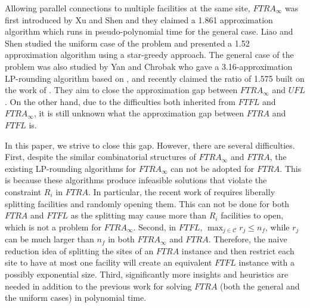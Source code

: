 \documentclass[10pt]{llncs}
\begin{document}
Allowing parallel connections to multiple facilities at the same site,
$FTRA_{\infty}$ was first introduced by Xu and Shen \cite{shihongftfa}
and they claimed a 1.861 approximation algorithm which runs in pseudo-polynomial
time for the general case. Liao and Shen \cite{kewen2011cocoon} studied
the uniform case of the problem and presented a 1.52 approximation
algorithm using a star-greedy approach. The general case of the problem
was also studied by Yan and Chrobak \cite{yan2011approximation} who
gave a 3.16-approximation LP-rounding algorithm based on \cite{Shmoys97FL,Chudak0312e},
and recently claimed the ratio of 1.575 \cite{yan2012lp} built on
the work of \cite{Chudak0312e,jaroslaw2010optimal,jaroslaw2012lp,Guha03FTFL2.41}.
They aim to close the approximation gap between $FTRA_{\infty}$ and
$UFL$. On the other hand, due to the difficulties both inherited
from $FTFL$ and $FTRA_{\infty}$, it is still unknown what the approximation
gap between $FTRA$ and $FTFL$ is.

In this paper, we strive to close this gap. However, there are several
difficulties. First, despite the similar combinatorial structures
of $FTRA_{\infty}$ and $FTRA$, the existing LP-rounding algorithms
\cite{yan2011approximation,yan2012lp} for $FTRA_{\infty}$ can not
be adopted for $FTRA$. This is because these algorithms produce infeasible
solutions that violate the constraint $R_{i}$ in $FTRA$. In particular,
the recent work of \cite{yan2012lp} requires liberally splitting
facilities and randomly opening them. This can not be done for both
$FTRA$ and $FTFL$ as the splitting may cause more than $R_{i}$
facilities to open, which is not a problem for $FTRA_{\infty}$. Second,
in $FTFL$, $\max_{j\in\mathcal{C}}r_{j}\leq n_{f}$, while $r_{j}$
can be much larger than $n_{f}$ in both $FTRA_{\infty}$ and $FTRA$.
Therefore, the naive reduction idea of splitting the sites of an $FTRA$
instance and then restrict each site to have at most one facility
will create an equivalent $FTFL$ instance with a possibly exponential
size. Third, significantly more insights and heuristics are needed
in addition to the previous work for solving $FTRA$ (both the general
and the uniform cases) in polynomial time.
\end{document}
